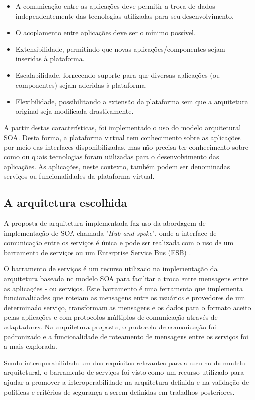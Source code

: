 \begin{itemize}
\item A comunicação entre as aplicações deve permitir a troca de dados independentemente das tecnologias utilizadas para seu desenvolvimento.
\item O acoplamento entre aplicações deve ser o mínimo possível.
\item Extensibilidade, permitindo que novas aplicações/componentes sejam inseridas à plataforma.
\item Escalabilidade, fornecendo suporte para que diversas aplicações (ou componentes) sejam aderidas à plataforma.
\item Flexibilidade,  possibilitando a extensão da plataforma sem que a arquitetura original seja modificada drasticamente.
\end{itemize}

A partir destas características, foi implementado o uso do modelo arquitetural SOA. Desta forma, a plataforma virtual tem conhecimento sobre as aplicações por meio das interfaces disponibilizadas, mas não precisa ter conhecimento sobre como ou quais tecnologias foram utilizadas para o desenvolvimento das aplicações. As aplicações, neste contexto, também podem ser denominadas serviços ou funcionalidades da plataforma virtual.

\subsection{A arquitetura escolhida}

A proposta de arquitetura implementada faz uso da abordagem de implementação de SOA chamada "\textit{Hub-and-spoke}", onde a interface de comunicação entre os serviços é única e pode ser realizada com o uso de um barramento de serviços ou um Enterprise Service Bus (ESB) \cite{Bianco2007}.

O barramento de serviços é um recurso utilizado na implementação da arquitetura baseada no modelo SOA para facilitar a troca entre mensagens entre as aplicações - ou serviços. Este barramento é uma ferramenta que implementa funcionalidades que roteiam as mensagens entre os usuários e provedores de um determinado serviço, transformam as mensagens e os dados para o formato aceito pelas aplicações e com protocolos múltiplos de comunicação através de adaptadores. Na arquitetura proposta, o protocolo de comunicação foi padronizado e a funcionalidade de roteamento de mensagens entre os serviços foi a mais explorada.

Sendo interoperabilidade um dos requisitos relevantes para a escolha do modelo arquitetural, o barramento de serviços foi visto como um recurso utilizado para ajudar a promover a interoperabilidade na arquitetura definida e na validação de políticas e critérios de segurança a serem definidas em trabalhos posteriores.

